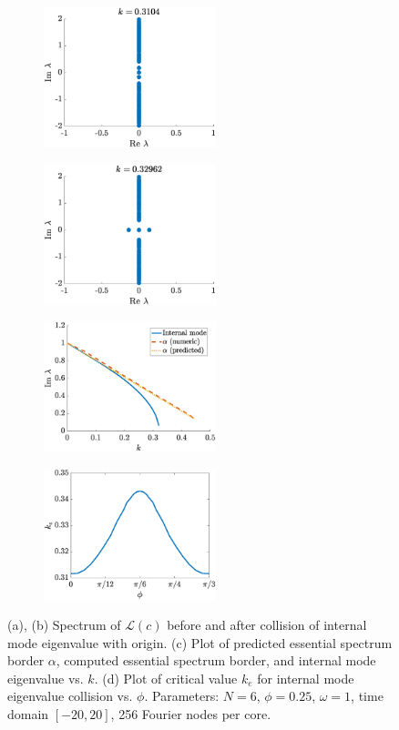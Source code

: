 \documentclass[11pt,reqno]{amsart}
\def\calL{{\mathcal L}}
\begin{document}
\begin{figure}
    \centering
    \begin{subfigure}{0.4\linewidth}
        \caption{}
        \label{fig:phi0speca}
        \includegraphics[width=5cm]{phi025spec2.eps}
    \end{subfigure}
    \begin{subfigure}{0.4\linewidth}
        \caption{}
        \label{fig:phi0specb}
        \includegraphics[width=5cm]{phi025spec3.eps}
    \end{subfigure}
    \begin{subfigure}{0.4\linewidth}
        \caption{}
        \label{fig:phi0specc}
        \includegraphics[width=5cm]{phi025speck.eps}
    \end{subfigure}
    \begin{subfigure}{0.4\linewidth}
        \caption{}
        \label{fig:phi0specd}
        \includegraphics[width=5cm]{keplot.eps}
    \end{subfigure}

    \caption{(a), (b) Spectrum of $\calL(c)$ before and after collision of internal mode eigenvalue with origin. (c) Plot of predicted essential spectrum border $\alpha$, computed essential spectrum border, and internal mode eigenvalue vs. $k$. (d) Plot of critical value $k_e$ for internal mode eigenvalue collision vs. $\phi$. Parameters: $N=6$, $\phi = 0.25$, $\omega=1$, time domain $[-20,20]$, 256 Fourier nodes per core.}
    \label{fig:phi0spec}
\end{figure}
\end{document}
